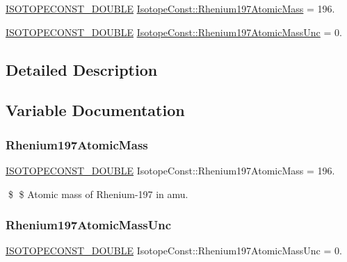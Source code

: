 \begin{DoxyCompactItemize}
\item 
\mbox{\hyperlink{group___isotope_const-_macros_ga8f45a7272ce02c0b4c65c44636ed719a}{I\+S\+O\+T\+O\+P\+E\+C\+O\+N\+S\+T\+\_\+\+D\+O\+U\+B\+LE}} \mbox{\hyperlink{group___isotope_const-_rhenium-_re197_ga33afbe66bfbe4f0c8cb375c3192db609}{Isotope\+Const\+::\+Rhenium197\+Atomic\+Mass}} = 196.
\item 
\mbox{\hyperlink{group___isotope_const-_macros_ga8f45a7272ce02c0b4c65c44636ed719a}{I\+S\+O\+T\+O\+P\+E\+C\+O\+N\+S\+T\+\_\+\+D\+O\+U\+B\+LE}} \mbox{\hyperlink{group___isotope_const-_rhenium-_re197_gae47536c6d06a56de7223516986b7af1e}{Isotope\+Const\+::\+Rhenium197\+Atomic\+Mass\+Unc}} = 0.
\end{DoxyCompactItemize}


\subsection{Detailed Description}


\subsection{Variable Documentation}
\mbox{\label{group___isotope_const-_rhenium-_re197_ga33afbe66bfbe4f0c8cb375c3192db609}} 
\subsubsection{\texorpdfstring{Rhenium197\+Atomic\+Mass}{Rhenium197AtomicMass}}
{\footnotesize\ttfamily \mbox{\hyperlink{group___isotope_const-_macros_ga8f45a7272ce02c0b4c65c44636ed719a}{I\+S\+O\+T\+O\+P\+E\+C\+O\+N\+S\+T\+\_\+\+D\+O\+U\+B\+LE}} Isotope\+Const\+::\+Rhenium197\+Atomic\+Mass = 196.}

\$ \$ Atomic mass of Rhenium-\/197 in amu. \mbox{\label{group___isotope_const-_rhenium-_re197_gae47536c6d06a56de7223516986b7af1e}} 
\subsubsection{\texorpdfstring{Rhenium197\+Atomic\+Mass\+Unc}{Rhenium197AtomicMassUnc}}
{\footnotesize\ttfamily \mbox{\hyperlink{group___isotope_const-_macros_ga8f45a7272ce02c0b4c65c44636ed719a}{I\+S\+O\+T\+O\+P\+E\+C\+O\+N\+S\+T\+\_\+\+D\+O\+U\+B\+LE}} Isotope\+Const\+::\+Rhenium197\+Atomic\+Mass\+Unc = 0.}

